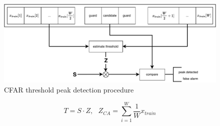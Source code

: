 \begin{figure}[h]
	\includegraphics[width=\linewidth]{images/peakdet}
	
	\caption{CFAR threshold peak detection procedure \cite{rohling11}}
	\label{fig:simsig}
\end{figure}

\begin{equation}
	T=S\cdot Z,~~~Z_{CA}=\sum_{i=1}^{W}\dfrac{1}{W}x_{train}
	\label{eq:cff}
\end{equation}

